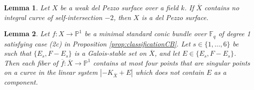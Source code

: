 \documentclass[a4paper, 11pt, reqno]{amsart}
\numberwithin{equation}{section} \numberwithin{figure}{section}
\def \F {{\mathbb F}}
\def \P {{\mathbb P}}
\newcommand{\ra}{\rightarrow}
\newtheorem{lemma}{Lemma}
\theoremstyle{definition}
\numberwithin{lemma}{section}
\begin{document}
\begin{lemma} \label{lem:weakdphas-2}
    Let $X$ be a weak del Pezzo surface over a field $k$. If $\overline{X}$ contains no integral curve of self-intersection $-2$, then $X$ is a del Pezzo surface.
\end{lemma}

\begin{lemma}\label{lem:(2c)singpoints-KX+Ei}
    Let $f \colon X \ra \P^1$ be a minimal standard conic bundle over $\F_q$ of degree 1 satisfying case (2c) in Proposition \ref{prop:classificationCB}. Let $s \in \{1, \ldots, 6\}$ be such that $\{E_s, F - E_s\}$ is a Galois-stable set on $\overline{X}$, and let $E \in \{E_s, F - E_s\}$. Then each fiber of $\overline{f} \colon \overline{X} \ra \P^1$ contains at most four points that are singular points on a  curve in the linear system $|-K_{\overline{X}} + E|$ which does not contain $E$ as a component.
\end{lemma}
\end{document}
